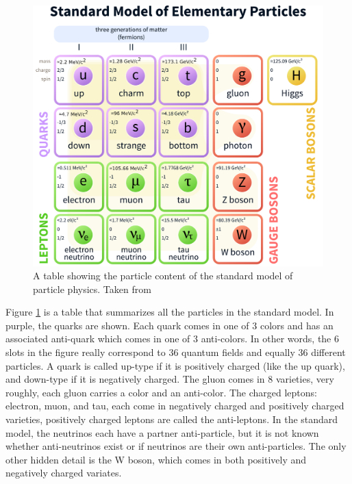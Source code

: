  \begin{figure}[h!]
    \centering
    \includegraphics[width=\textwidth]{figures/standard_model_2.pdf}
    \caption{A table showing the particle content of the standard model of particle physics. Taken from \cite{SM_wiki}}
    \label{fig:standard_model}
  \end{figure}  

  Figure \ref{fig:standard_model} is a table that summarizes all the particles in the standard model. In purple, the quarks are shown. Each quark comes in one of 3 colors and has an associated anti-quark which comes in one of 3 anti-colors. In other words, the 6 slots in the figure really correspond to 36 quantum fields and equally 36 different particles. A quark is called up-type if it is positively charged (like the up quark), and down-type if it is negatively charged. The gluon comes in 8 varieties, very roughly, each gluon carries a color and an anti-color. The charged leptons: electron, muon, and tau, each come in negatively charged and positively charged varieties, positively charged leptons are called the anti-leptons. In the standard model, the neutrinos each have a partner anti-particle, but it is not known whether anti-neutrinos exist or if neutrinos are their own anti-particles. The only other hidden detail is the W boson, which comes in both positively and negatively charged variates.

